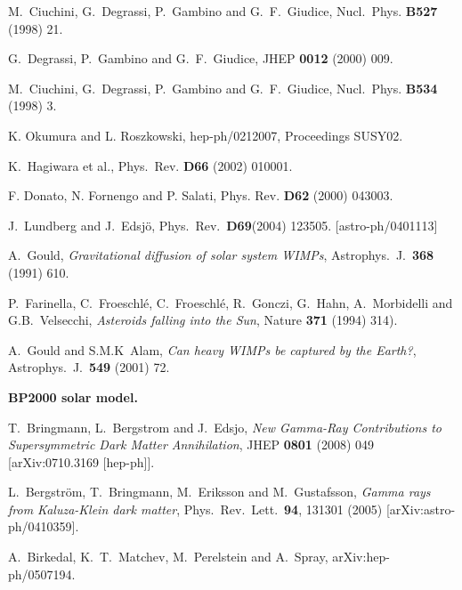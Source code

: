 \begin{thebibliography}{99}
 M.~Ciuchini, G.~Degrassi, P.~Gambino and G.~F.~Giudice, Nucl.~Phys. {\bf B527}  (1998) 21.

 G.~Degrassi, P.~Gambino and G.~F.~Giudice, JHEP {\bf 0012} (2000) 009.

 M.~Ciuchini, G.~Degrassi, P.~Gambino and G.~F.~Giudice, Nucl.~Phys. {\bf B534}  (1998) 3.

 K. Okumura and L. Roszkowski, hep-ph/0212007, Proceedings SUSY02.

  K.~Hagiwara et al., Phys.~Rev. {\bf D66} (2002) 010001.

 F. Donato, N. Fornengo and P. Salati, Phys. Rev. {\bf D62} (2000)
 043003.

J.~Lundberg and J.~Edsj\"o, Phys.\ Rev.\ {\bfseries D69}(2004)
123505. [astro-ph/0401113]

A.~Gould, 
\emph{Gravitational diffusion of solar system WIMPs},
Astrophys.\ J.\ {\bfseries 368} (1991) 610.

P.~Farinella, C.~Froeschl\'e,
  C.~Froeschl\'e, R.~Gonczi, G.~Hahn, A.~Morbidelli and G.B.~Velsecchi,
  \emph{Asteroids falling into the Sun},
  Nature {\bfseries 371} (1994) 314).

A.~Gould and S.M.K~Alam,
\emph{Can heavy WIMPs be captured by the Earth?},
Astrophys.\ J.\ {\bfseries 549} (2001) 72.

{\bfseries BP2000 solar model.}

  T.~Bringmann, L.~Bergstrom and J.~Edsjo,
  \emph{New Gamma-Ray Contributions to Supersymmetric Dark Matter Annihilation},
  JHEP {\bf 0801} (2008) 049
  [arXiv:0710.3169 [hep-ph]].

  L.~Bergstr\"om, T.~Bringmann, M.~Eriksson and M.~Gustafsson,
  \emph{Gamma rays from Kaluza-Klein dark matter},
  Phys.\ Rev.\ Lett.\  {\bf 94}, 131301 (2005)
  [arXiv:astro-ph/0410359].

  A.~Birkedal, K.~T.~Matchev, M.~Perelstein and A.~Spray,
  arXiv:hep-ph/0507194.


\end{thebibliography}
